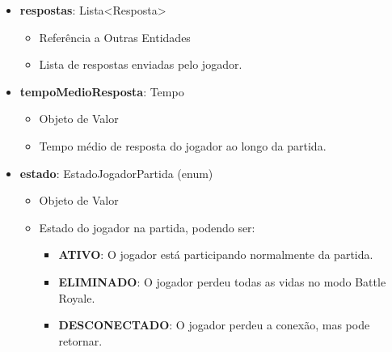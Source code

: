 \begin{itemize}
        \item \textbf{respostas}: Lista\textless Resposta\textgreater  
              \begin{itemize}
                  \item Referência a Outras Entidades
                  \item Lista de respostas enviadas pelo jogador.
              \end{itemize}
    
        \item \textbf{tempoMedioResposta}: Tempo  
              \begin{itemize}
                  \item Objeto de Valor
                  \item Tempo médio de resposta do jogador ao longo da partida.
              \end{itemize}
    
        \item \textbf{estado}: EstadoJogadorPartida (enum)  
              \begin{itemize}
                  \item Objeto de Valor
                  \item Estado do jogador na partida, podendo ser:
                  \begin{itemize}
                      \item \textbf{ATIVO}: O jogador está participando normalmente da partida.
                      \item \textbf{ELIMINADO}: O jogador perdeu todas as vidas no modo Battle Royale.
                      \item \textbf{DESCONECTADO}: O jogador perdeu a conexão, mas pode retornar.
                  \end{itemize}
              \end{itemize}
    \end{itemize}
